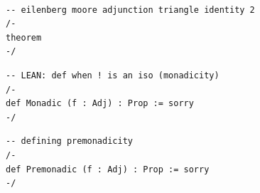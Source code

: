 \documentclass{book}
\newcounter{lcounter}
\newcounter{sectioncount}
\newcounter{subsectioncount}
\renewcommand{\section}[1]{\newpage
\ \\
\ \\
 \begin{center} \scalebox{1.5}{\texttt{\thesectioncount . #1}} \setcounter{sectioncount}{\thesectioncount+1} \setcounter{subsectioncount}{1} \end{center}
 \begin{center}

\ \\
\ \\

\thispagestyle{empty}
\end{center}
}
\begin{document}
\begin{center}
\begin{tcolorbox}[width=5in,colback={white},title={\begin{center}\texttt{Lean \thelcounter} \addtocounter{lcounter}{1}  \end{center}},colbacktitle=Blue,coltitle=black]
\begin{verbatim}

-- eilenberg moore adjunction triangle identity 2
/-
theorem
-/

\end{verbatim}%
\end{tcolorbox}
\end{center}


\begin{center}
\begin{tcolorbox}[width=5in,colback={white},title={\begin{center}\texttt{Lean \thelcounter} \addtocounter{lcounter}{1}  \end{center}},colbacktitle=Blue,coltitle=black]
\begin{verbatim}
-- LEAN: def when ! is an iso (monadicity)
/-
def Monadic (f : Adj) : Prop := sorry
-/
\end{verbatim}%
\end{tcolorbox}
\end{center}


\begin{center}
\begin{tcolorbox}[width=5in,colback={white},title={\begin{center}\texttt{Lean \thelcounter} \addtocounter{lcounter}{1}  \end{center}},colbacktitle=Blue,coltitle=black]
\begin{verbatim}
-- defining premonadicity
/-
def Premonadic (f : Adj) : Prop := sorry
-/
\end{verbatim}%
\end{tcolorbox}
\end{center}


\section{\texttt{comonadicity}}
\end{document}
